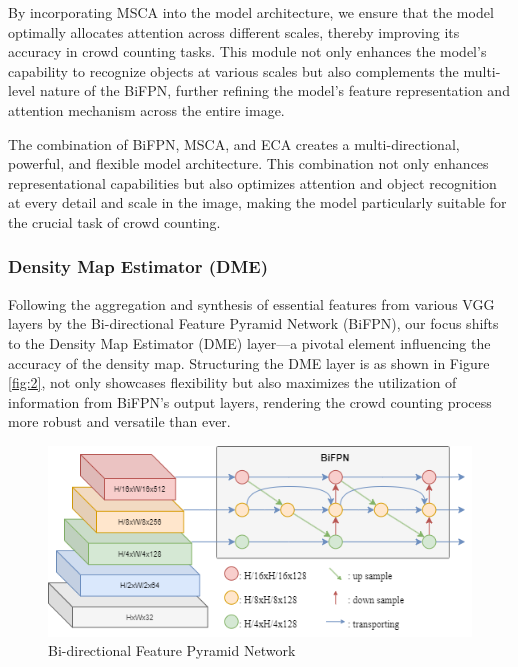 \documentclass[journal]{IEEEtran}
\begin{document}
By incorporating MSCA into the model architecture, we ensure that the model optimally allocates attention across different scales, thereby improving its accuracy in crowd counting tasks. This module not only enhances the model's capability to recognize objects at various scales but also complements the multi-level nature of the BiFPN, further refining the model's feature representation and attention mechanism across the entire image.

The combination of BiFPN, MSCA, and ECA creates a multi-directional, powerful, and flexible model architecture. This combination not only enhances representational capabilities but also optimizes attention and object recognition at every detail and scale in the image, making the model particularly suitable for the crucial task of crowd counting.

\subsubsection{\textbf{Density Map Estimator (DME)}}
Following the aggregation and synthesis of essential features from various VGG layers by the Bi-directional Feature Pyramid Network (BiFPN), our focus shifts to the Density Map Estimator (DME) layer—a pivotal element influencing the accuracy of the density map. Structuring the DME layer is as shown in Figure \ref*{fig:2}, not only showcases flexibility but also maximizes the utilization of information from BiFPN's output layers, rendering the crowd counting process more robust and versatile than ever.



\begin{figure}[ht]
        \centering
        \includegraphics[width=\linewidth]{Fig/BiFPN.png}
        \caption{Bi-directional Feature Pyramid Network}
        \label{BiFPN}
\end{figure}
\end{document}
